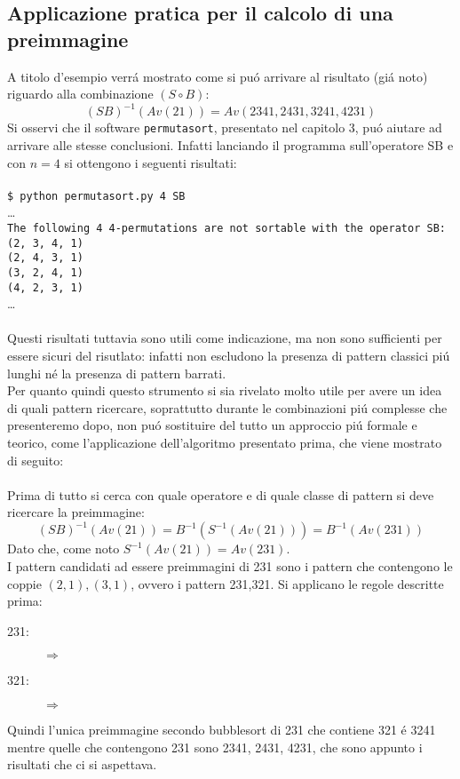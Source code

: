 \subsection*{Applicazione pratica per il calcolo di una preimmagine}
A titolo d'esempio verr\'a mostrato come si pu\'o arrivare al risultato (gi\'a noto) riguardo alla combinazione $(S\circ B)$:
$$(SB)^{-1}(Av(21)) = Av(2341, 2431, 3241, 4231)$$
Si osservi che il software \texttt{permutasort}, presentato nel capitolo 3, pu\'o aiutare ad arrivare alle stesse conclusioni. Infatti lanciando il programma sull'operatore SB e con $n=4$ si ottengono i seguenti risultati:\\\\
\texttt{\$ python permutasort.py 4 SB }\\\dots\\\texttt{The following 4 4-permutations are not sortable with the operator SB:}\\\texttt{(2, 3, 4, 1)}\\\texttt{(2, 4, 3, 1)}\\\texttt{(3, 2, 4, 1)}\\\texttt{(4, 2, 3, 1)}\\\dots\\\\
Questi risultati tuttavia sono utili come indicazione, ma non sono sufficienti per essere sicuri del risutlato: infatti non escludono la presenza di pattern classici pi\'u lunghi n\'e la presenza di pattern barrati.\\
Per quanto quindi questo strumento si sia rivelato molto utile per avere un idea di quali pattern ricercare, soprattutto durante le combinazioni pi\'u complesse che presenteremo dopo, non pu\'o sostituire del tutto un approccio pi\'u formale e teorico, come l'applicazione dell'algoritmo presentato prima, che viene mostrato di seguito:\\\\ 
Prima di tutto si cerca con quale operatore e di quale classe di pattern si deve ricercare la preimmagine:
$$(SB)^{-1}(Av(21)) = B^{-1}(S^{-1}(Av(21)))=B^{-1}(Av(231))$$
Dato che, come noto $S^{-1}(Av(21))=Av(231)$.\\I pattern candidati ad essere preimmagini di 231 sono i pattern che contengono le coppie $(2,1),(3,1)$, ovvero i pattern 231,321. Si applicano le regole descritte prima:
\begin{description}
	\item[231:]\begin{center}
	$\Rightarrow$
	\end{center}
	\item[321:] \begin{center}
		$\Rightarrow$
	\end{center}
\end{description}
Quindi l'unica preimmagine secondo bubblesort di 231 che contiene 321 \'e 3241 mentre quelle che contengono 231 sono 2341, 2431, 4231, che sono appunto i risultati che ci si aspettava.
